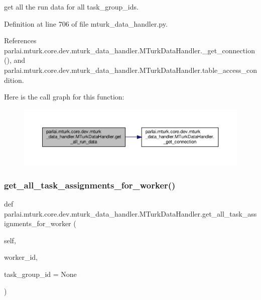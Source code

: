 \begin{DoxyVerb}get all the run data for all task_group_ids.\end{DoxyVerb}
 

Definition at line 706 of file mturk\+\_\+data\+\_\+handler.\+py.



References parlai.\+mturk.\+core.\+dev.\+mturk\+\_\+data\+\_\+handler.\+M\+Turk\+Data\+Handler.\+\_\+get\+\_\+connection(), and parlai.\+mturk.\+core.\+dev.\+mturk\+\_\+data\+\_\+handler.\+M\+Turk\+Data\+Handler.\+table\+\_\+access\+\_\+condition.

Here is the call graph for this function\+:
\nopagebreak
\begin{figure}[H]
\begin{center}
\leavevmode
\includegraphics[width=350pt]{classparlai_1_1mturk_1_1core_1_1dev_1_1mturk__data__handler_1_1MTurkDataHandler_a23837cfc187beca71c486a2b3000459e_cgraph}
\end{center}
\end{figure}
\mbox{\label{classparlai_1_1mturk_1_1core_1_1dev_1_1mturk__data__handler_1_1MTurkDataHandler_a7d86983e9f01a1f785284bbda21a2860}} 
\subsubsection{\texorpdfstring{get\+\_\+all\+\_\+task\+\_\+assignments\+\_\+for\+\_\+worker()}{get\_all\_task\_assignments\_for\_worker()}}
{\footnotesize\ttfamily def parlai.\+mturk.\+core.\+dev.\+mturk\+\_\+data\+\_\+handler.\+M\+Turk\+Data\+Handler.\+get\+\_\+all\+\_\+task\+\_\+assignments\+\_\+for\+\_\+worker (\begin{DoxyParamCaption}\item[{}]{self,  }\item[{}]{worker\+\_\+id,  }\item[{}]{task\+\_\+group\+\_\+id = {\ttfamily None} }\end{DoxyParamCaption})}

